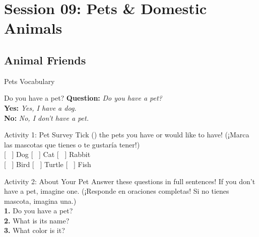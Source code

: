\section*{Session 09: Pets \& Domestic Animals}
\subsection*{Animal Friends}

\begin{vocabcard}{Pets Vocabulary}
\end{vocabcard}

\begin{grammartip}{Do you have a pet?}
  \textbf{Question:} \emph{Do you have a pet?}\\
  \textbf{Yes:} \emph{Yes, I have a dog.}\\
  \textbf{No:} \emph{No, I don't have a pet.}
\end{grammartip}

\begin{activity}{Activity 1: Pet Survey}
  Tick () the pets you have or would like to have! (¡Marca las mascotas que tienes o te gustaría tener!)\\
  {[ \ ]} Dog \hspace{2cm} {[ \ ]} Cat \hspace{2cm} {[ \ ]} Rabbit\\
  {[ \ ]} Bird \hspace{1.8cm} {[ \ ]} Turtle \hspace{1.6cm} {[ \ ]} Fish
\end{activity}

\begin{activity}{Activity 2: About Your Pet}
  Answer these questions in full sentences! If you don't have a pet, imagine one. (¡Responde en oraciones completas! Si no tienes mascota, imagina una.)\\
  \textbf{1.} Do you have a pet?\\
  \writinglines[1]
  \textbf{2.} What is its name?\\
  \writinglines[1]
  \textbf{3.} What color is it?\\
  \writinglines[1]
\end{activity}

